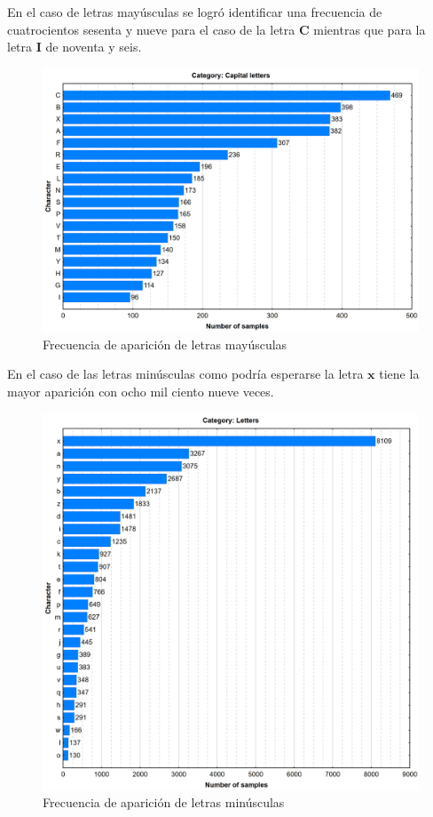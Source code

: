En el caso de letras mayúsculas se logró identificar una frecuencia de cuatrocientos sesenta y nueve para el caso de la letra \textbf{C} mientras que para la letra \textbf{I} de noventa y seis.
\begin{figure}[H]
	\centering
	\includegraphics[width=1\textwidth]{capitulo3/imgs/capital_letters_distribution.png}
	\caption{Frecuencia de aparición de letras mayúsculas \cite{EXTRACTOR}}
	\label{fig:CapLetters}
\end{figure}
\newpage
En el caso de las letras minúsculas como podría esperarse la letra $\textbf{x}$ tiene la mayor aparición con ocho mil ciento nueve veces.
\begin{figure}[H]
	\centering
	\includegraphics[width=1\textwidth]{capitulo3/imgs/lowercase_letters_distribution.png}
	\caption{Frecuencia de aparición de letras minúsculas \cite{EXTRACTOR}}
	\label{fig:LowerLetters}
\end{figure}
